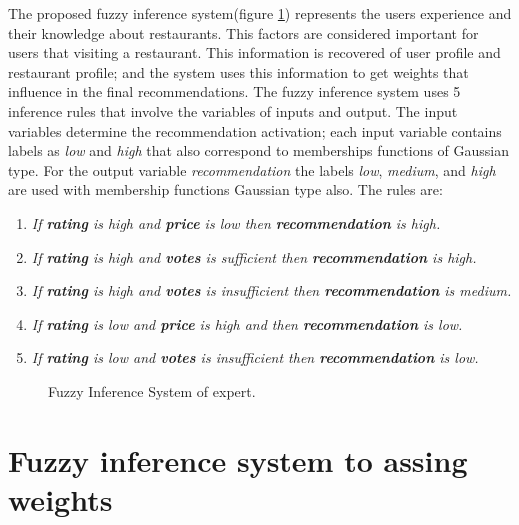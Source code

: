 The proposed fuzzy inference system(figure \ref{fig:expertfis})
represents the users experience and their knowledge about restaurants.
This factors are considered important for users that visiting a
restaurant. This information is recovered of user profile and
restaurant profile; and the system uses this information to get
weights that influence in the final recommendations. The fuzzy
inference system uses 5 inference rules that involve the variables of
inputs and output. The input variables determine the recommendation
activation; each input variable contains labels as \textit{low} and
\textit{high} that also correspond to memberships functions of
Gaussian type. For the output variable \textit{recommendation} the
labels \textit{low}, \textit{medium}, and \textit{high} are used with
membership functions Gaussian type also. The rules are:
\begin{enumerate} 
\item \textit{If \textbf{rating} is high and \textbf{price} is low then 
\textbf{recommendation} is high.}
\item \textit{If \textbf{rating} is high and \textbf{votes} is sufficient then 
\textbf{recommendation} is high.}
\item \textit{If \textbf{rating} is high and \textbf{votes} is insufficient then 
\textbf{recommendation} is medium.}
\item \textit{If \textbf{rating} is low and \textbf{price} is high and then 
\textbf{recommendation} is low.} 
\item \textit{If \textbf{rating} is low and \textbf{votes} is insufficient then 
\textbf{recommendation} is low.}
\end{enumerate} 
\begin{figure}
\captionsetup{justification=centering,margin=2cm,font=footnotesize}
\centering
{}
\caption{Fuzzy Inference System of expert.}
\label{fig:expertfis}      
\end{figure}

\section{Fuzzy inference system to assing weights} 

